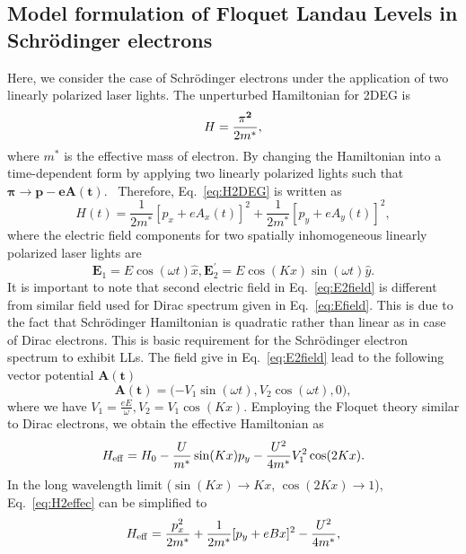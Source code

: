 \documentclass[aps,pra,preprint,showpacs]{revtex4-1}
\begin{document}
\subsection{Model formulation of Floquet Landau Levels in Schr\"{o}dinger electrons}
Here, we consider the case of Schr\"{o}dinger electrons under the application of two linearly polarized laser lights. The unperturbed Hamiltonian for 2DEG is
\begin{equation} \label{eq:H2DEG}
	H=\frac{\bf{\pi}^{2}}{2m^{\ast}},
\end{equation}
where $m^{\ast}$ is the effective mass of electron. By changing the Hamiltonian into a time-dependent form by applying two linearly polarized lights
such that $\mathbf{\pi\rightarrow p-eA(t)}$. \ Therefore, Eq.~\eqref{eq:H2DEG} is written as
\begin{equation} \label{eq:H2time}
	H(t)=\frac{1}{2m^{\ast}}[p_{x}+eA_{x}(t)]^{2}+\frac{1}{2m^{\ast}}[p_{y}
	+eA_{y}(t)]^{2},
\end{equation}
where the electric field components for two spatially inhomogeneous linearly polarized laser lights are
\begin{equation} \label{eq:E2field}
	\mathbf{E}_{1} =E\cos (\omega t)\hat{x},\mathbf{E}_{2}^{\prime}=E\cos
	(Kx)\sin (\omega t)\hat{y}.
\end{equation}
It is important to note that second electric field in Eq.~\eqref{eq:E2field} is different from similar field used for Dirac spectrum given in Eq.~\eqref{eq:Efield}. This is due to the fact that Schr\"{o}dinger Hamiltonian is quadratic rather than linear as in case of Dirac electrons. This is basic requirement for the Schr\"{o}dinger electron spectrum to exhibit LLs. The field give in Eq.~\eqref{eq:E2field} lead to the following vector potential $\mathbf{A(t)}$
\begin{equation} \label{eq:A2vector}
	\mathbf{A(t)=(- }V_1\sin (\omega t), V_2 \cos (\omega t),0\mathbf{),} 
\end{equation}
where we have $V_{1}=\frac{eE}{\omega },V_{2}=V_1\cos(Kx)$. Employing the Floquet theory similar to Dirac electrons, we obtain the effective Hamiltonian as
\begin{equation}\label{eq:H2effec}
	H_{\rm eff}  =H_{0} -\frac{U}{m^{\ast}}\sin (Kx) p_{y} -\frac{U^2}{4m^{\ast}}V_{1}^{2}\cos(2Kx).
\end{equation}
In the long wavelength limit ($\sin(Kx) \rightarrow Kx$, $\cos(2Kx) \rightarrow 1$), Eq.~\eqref{eq:H2effec} can be simplified to
\begin{equation} \label{eq:H2Feffect}
	H_{\rm eff}=\frac{p_{x}^{2}}{2m^{\ast}}+\frac{1}{2m^{\ast}}[p_{y}
	+eBx]^{2}-\frac{U^{2}}{4m^{\ast}},
\end{equation}
\end{document}

